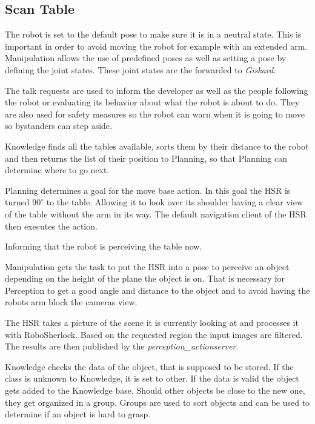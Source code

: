 \documentclass[main.tex]{subfiles}
\begin{document}
	\subsection{Scan Table}
	
	The robot is set to the default pose to make sure it is in a neutral state. This is important in order to avoid moving the robot for example with an extended arm. Manipulation allows the use of predefined poses as well as setting a pose by defining the joint states. These joint states are the forwarded to \textit{Giskard}.
	
	
	The talk requests are used to inform the developer as well as the people following the robot or evaluating its behavior about what the robot is about to do. They are also used for safety measures so the robot can warn when it is going to move so bystanders can step aside. 
	
	Knowledge finds all the tables available, sorts them by their distance to the robot and then returns the list of their position to Planning, so that Planning can determine where to go next.
	
	Planning determines a goal for the move base action. In this goal the HSR is turned $90^\circ$ to the table. Allowing it to look over its shoulder having a clear view of the table without the arm in its way. The default navigation client of the HSR then executes the action. 
	
	Informing that the robot is perceiving the table now.
	
	Manipulation gets the task to put the HSR into a pose to perceive an object depending on the height of the plane the object is on.
    That is necessary for Perception to get a good angle and distance to the object and to avoid having the robots arm block the cameras view.
	
	The HSR takes a picture of the scene it is currently looking at and processes it with RoboSherlock. Based on the requested region the input images are filtered. The results are then published by the \textit{perception\_actionserver}.
	
	Knowledge checks the data of the object, that is supposed to be stored. If the class is unknown to Knowledge, it is set to other. If the data is valid the object gets added to the Knowledge base. Should other objects be close to the new one, they get organized in a group. Groups are used to sort objects and can be used to determine if an object is hard to grasp.
	
\end{document}
